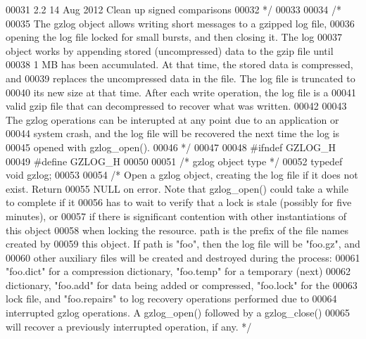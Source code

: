 \begin{DoxyCode}
00031 \textcolor{comment}{   2.2  14 Aug 2012  Clean up signed comparisons}
00032 \textcolor{comment}{ */}
00033 
00034 \textcolor{comment}{/*}
00035 \textcolor{comment}{   The gzlog object allows writing short messages to a gzipped log file,}
00036 \textcolor{comment}{   opening the log file locked for small bursts, and then closing it.  The log}
00037 \textcolor{comment}{   object works by appending stored (uncompressed) data to the gzip file until}
00038 \textcolor{comment}{   1 MB has been accumulated.  At that time, the stored data is compressed, and}
00039 \textcolor{comment}{   replaces the uncompressed data in the file.  The log file is truncated to}
00040 \textcolor{comment}{   its new size at that time.  After each write operation, the log file is a}
00041 \textcolor{comment}{   valid gzip file that can decompressed to recover what was written.}
00042 \textcolor{comment}{}
00043 \textcolor{comment}{   The gzlog operations can be interupted at any point due to an application or}
00044 \textcolor{comment}{   system crash, and the log file will be recovered the next time the log is}
00045 \textcolor{comment}{   opened with gzlog\_open().}
00046 \textcolor{comment}{ */}
00047 
00048 \textcolor{preprocessor}{#ifndef GZLOG\_H}
00049 \textcolor{preprocessor}{#define GZLOG\_H}
00050 
00051 \textcolor{comment}{/* gzlog object type */}
00052 \textcolor{keyword}{typedef} \textcolor{keywordtype}{void} gzlog;
00053 
00054 \textcolor{comment}{/* Open a gzlog object, creating the log file if it does not exist.  Return}
00055 \textcolor{comment}{   NULL on error.  Note that gzlog\_open() could take a while to complete if it}
00056 \textcolor{comment}{   has to wait to verify that a lock is stale (possibly for five minutes), or}
00057 \textcolor{comment}{   if there is significant contention with other instantiations of this object}
00058 \textcolor{comment}{   when locking the resource.  path is the prefix of the file names created by}
00059 \textcolor{comment}{   this object.  If path is "foo", then the log file will be "foo.gz", and}
00060 \textcolor{comment}{   other auxiliary files will be created and destroyed during the process:}
00061 \textcolor{comment}{   "foo.dict" for a compression dictionary, "foo.temp" for a temporary (next)}
00062 \textcolor{comment}{   dictionary, "foo.add" for data being added or compressed, "foo.lock" for the}
00063 \textcolor{comment}{   lock file, and "foo.repairs" to log recovery operations performed due to}
00064 \textcolor{comment}{   interrupted gzlog operations.  A gzlog\_open() followed by a gzlog\_close()}
00065 \textcolor{comment}{   will recover a previously interrupted operation, if any. */}

\end{DoxyCode}

